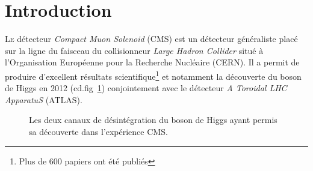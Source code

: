 \chapter*{Introduction}
\renewcommand\chapterillustration{INT/INT}
\ThisULCornerWallPaper{1}{\chapterillustration}

\lettrine[lines=4, slope=-0.5em,nindent=10pt]{L}{e} détecteur \textit{Compact Muon Solenoid} (CMS) est un détecteur généraliste placé sur la ligne du faisceau du collisionneur \textit{Large Hadron Collider} situé à l'Organisation Européenne pour la Recherche Nucléaire (CERN). Il a permit de produire d'excellent résultats scientifique\footnote{Plus de \num{600} papiers ont été publiés} et notamment la découverte du boson de Higgs en \num{2012} (cd.fig~\ref{higgs}) conjointement avec le détecteur \textit{A Toroidal LHC ApparatuS} (ATLAS). 


\begin{figure}[ht!]
	\centering
	\hfill
	\caption{Les deux canaux de désintégration du boson de Higgs ayant permis sa découverte dans l'expérience CMS.}
	\label{higgs}
\end{figure}

